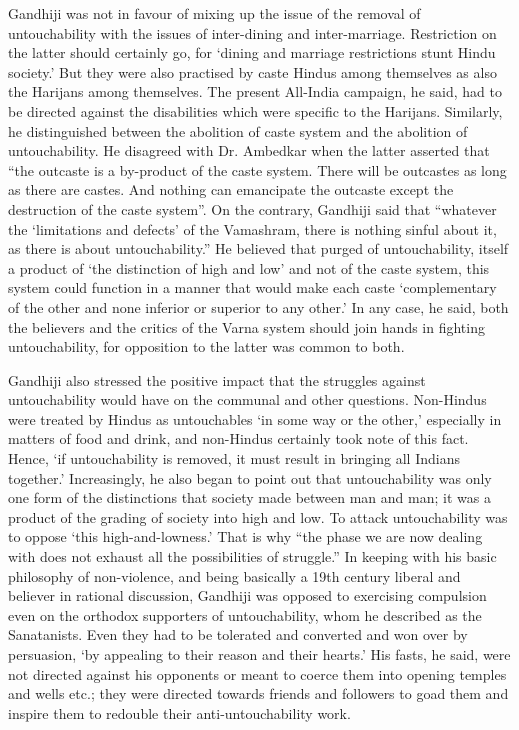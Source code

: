 \begin{multicols}{2}
Gandhiji was not in favour of mixing up the issue of the removal of untouchability with the issues of inter-dining and inter-marriage. Restriction on the latter should certainly go, for `dining and marriage restrictions stunt Hindu society.' But they were also practised by caste Hindus among themselves as also the Harijans among themselves. The present All-India campaign, he said, had to be directed against the disabilities which were specific to the Harijans. Similarly, he distinguished between the abolition of caste system and the abolition of untouchability. He disagreed with Dr. Ambedkar when the latter asserted that ``the outcaste is a by-product of the caste system. There will be outcastes as long as there are castes. And nothing can emancipate the outcaste except the destruction of the caste system''. On the contrary, Gandhiji said that ``whatever the `limitations and defects' of the Vamashram, there is nothing sinful about it, as there is about untouchability.'' He believed that purged of untouchability, itself a product of `the distinction of high and low' and not of the caste system, this system could function in a manner that would make each caste `complementary of the other and none inferior or superior to any other.' In any case, he said, both the believers and the critics of the Varna system should join hands in fighting untouchability, for opposition to the latter was common to both.

Gandhiji also stressed the positive impact that the struggles against untouchability would have on the communal and other questions. Non-Hindus were treated by Hindus as untouchables `in some way or the other,' especially in matters of food and drink, and non-Hindus certainly took note of this fact. Hence, `if untouchability is removed, it must result in bringing all Indians together.' Increasingly, he also began to point out that untouchability was only one form of the distinctions that society made between man and man; it was a product of the grading of society into high and low. To attack untouchability was to oppose `this high-and-lowness.' That is why ``the phase we are now dealing with does not exhaust all the possibilities of struggle.'' In keeping with his basic philosophy of non-violence, and being basically a 19th century liberal and believer in rational discussion, Gandhiji was opposed to exercising compulsion even on the orthodox supporters of untouchability, whom he described as the Sanatanists. Even they had to be tolerated and converted and won over by persuasion, `by appealing to their reason and their hearts.' His fasts, he said, were not directed against his opponents or meant to coerce them into opening temples and wells etc.; they were directed towards friends and followers to goad them and inspire them to redouble their anti-untouchability work.


\end{multicols}
